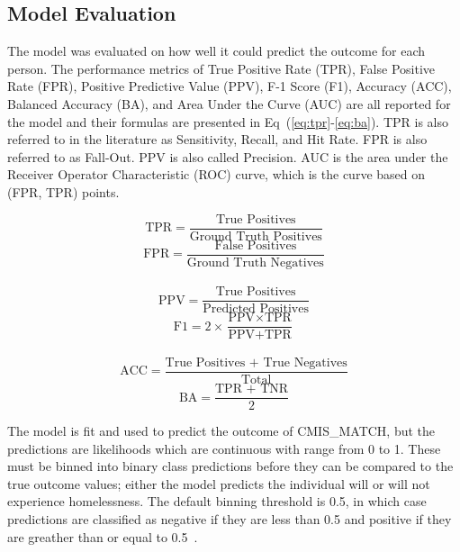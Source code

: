 \documentclass[10pt,letterpaper]{article}
\newcommand{\red}[1]{{\color{red}{#1}}}
\begin{document}
\subsection*{Model Evaluation}
The model was evaluated on how well it could predict the outcome for each person. The performance metrics of True Positive Rate (TPR), False Positive Rate (FPR), Positive Predictive Value (PPV), F-1 Score (F1), Accuracy (ACC), Balanced Accuracy (BA), and Area Under the Curve (AUC) are all reported for the model and their formulas are presented in Eq~(\ref{eq:tpr}-\ref{eq:ba}). TPR is also referred to in the literature as Sensitivity, Recall, and Hit Rate. FPR is also referred to as Fall-Out. PPV is also called Precision. AUC is the area under the Receiver Operator Characteristic (ROC) curve, which is the curve based on (FPR, TPR) points.

\begin{multicols}{2}
    \begin{equation}
        \text{TPR} = \frac{\text{True Positives}}{\text{Ground Truth Positives}}
        \label{eq:tpr}
    \end{equation}\break
    \begin{equation}
        \text{FPR} = \frac{\text{False Positives}}{\text{Ground Truth Negatives}}
        \label{eq:fpr}
    \end{equation}
    \\
    \begin{equation}
        \text{PPV} = \frac{\text{True Positives}}{\text{Predicted Positives}}
        \label{eq:ppv}
    \end{equation}\break
    \begin{equation}
        \text{F1} = 2\times\frac{\text{PPV}\times\text{TPR}}{\text{PPV} + \text{TPR}}
        \label{eq:f1}
    \end{equation}
    \\
    \begin{equation}
        \text{ACC} = \frac{\text{True Positives + True Negatives}}{\text{Total}}
        \label{eq:acc}
    \end{equation}\break
    \begin{equation}
        \text{BA} = \frac{\text{TPR + TNR}}{2}
        \label{eq:ba}
    \end{equation}
\end{multicols}
\red{remove all or some of these equations?}

The model is fit and used to predict the outcome of CMIS\_MATCH, but the predictions are likelihoods which are continuous with range from 0 to 1. These must be binned into binary class predictions before they can be compared to the true outcome values; either the model predicts the individual will or will not experience homelessness. The default binning threshold is 0.5, in which case predictions are classified as negative if they are less than 0.5 and positive if they are greather than or equal to 0.5~\cite{bewick2005statistics}. 
\end{document}
